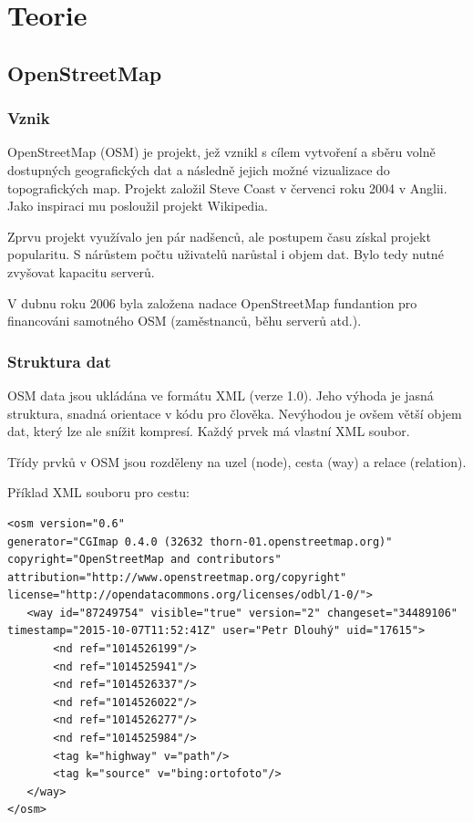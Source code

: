 \chapter{Teorie}
\label{2-Teorie}

\section{OpenStreetMap}
\label{OpenStreetMap}

\subsection{Vznik}
\label{vznik}
OpenStreetMap (OSM) je projekt, jež vznikl s cílem vytvoření a sběru 
volně dostupných geografických dat a následně jejich možné vizualizace
do topografických map. Projekt založil Steve Coast v červenci roku 
2004 v Anglii. Jako inspiraci mu posloužil projekt Wikipedia. 

Zprvu projekt využívalo jen pár nadšenců, ale postupem času získal 
projekt popularitu. S nárůstem počtu uživatelů narůstal i objem dat. 
Bylo tedy nutné zvyšovat kapacitu serverů. 

V dubnu roku 2006 byla založena nadace OpenStreetMap fundantion pro financováni 
samotného OSM (zaměstnanců, běhu serverů atd.). \cite{wikiOSM}


\subsection{Struktura dat}
\label{struktura dat}

OSM data jsou ukládána ve formátu XML (verze 1.0). Jeho výhoda je jasná 
struktura, snadná orientace v kódu pro člověka. Nevýhodou je ovšem větší objem 
dat, který lze ale snížit kompresí. Každý prvek má vlastní XML soubor. 

Třídy prvků v OSM jsou rozděleny na uzel (node), cesta (way) a 
relace (relation).

Příklad XML souboru pro cestu:

{\scriptsize
\begin{lstlisting}
<osm version="0.6" 
generator="CGImap 0.4.0 (32632 thorn-01.openstreetmap.org)" copyright="OpenStreetMap and contributors" attribution="http://www.openstreetmap.org/copyright" license="http://opendatacommons.org/licenses/odbl/1-0/">
   <way id="87249754" visible="true" version="2" changeset="34489106" timestamp="2015-10-07T11:52:41Z" user="Petr Dlouhý" uid="17615">
       <nd ref="1014526199"/>
       <nd ref="1014525941"/>
       <nd ref="1014526337"/>
       <nd ref="1014526022"/>
       <nd ref="1014526277"/>
       <nd ref="1014525984"/>
       <tag k="highway" v="path"/>
       <tag k="source" v="bing:ortofoto"/>
   </way>
</osm>
\end{lstlisting}
}


